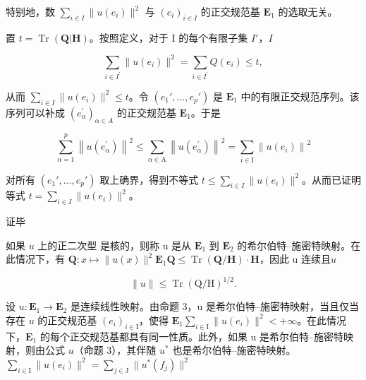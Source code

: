 特别地，数 \(\sum_{i\in I}\| u(e_i)\|^2\) 与 \((e_i)_{i\in I}\) 的正交规范基 \(\mathbf{E}_1\) 的选取无关。

置 \(t = \operatorname{Tr}(\mathbf{Q}|\mathbf{H})\)。按照定义，对于 I 的每个有限子集 \(I'\)，\(I\)

\[
\sum_ {i \in I ^ {\prime}} \| u (e _ {i}) \| ^ {2} = \sum_ {i \in I ^ {\prime}} Q (e _ {i}) \leqslant t,
\]

从而 \(\sum_{i\in I}\| u(e_i)\|^2\leqslant t\)。令 \((e_1',\dots ,e_p')\) 是 \(\mathbf{E}_1\) 中的有限正交规范序列。该序列可以补成 \((e_{\alpha}^{\prime})_{\alpha \in A}\) 的正交规范基 \(\mathbf{E}_1\)。于是

\[
\sum_ {\alpha = 1} ^ {p} \left\| u (e _ {\alpha} ^ {\prime}) \right\| ^ {2} \leqslant \sum_ {\alpha \in \mathrm{A}} \left\| u (e _ {\alpha} ^ {\prime}) \right\| ^ {2} = \sum_ {i \in \mathrm{I}} \left\| u (e _ {i}) \right\| ^ {2}
\]

对所有 \((e_1', \ldots, e_p')\) 取上确界，得到不等式 \(t \leqslant \sum_{i \in I} \| u(e_i) \|^2\)。从而已证明等式 \(t = \sum_{i \in I} \| u(e_i) \|^2\)。

证毕

如果 \(u\) 上的正二次型  是核的，则称 u 是从 \(\mathbf{E}_1\) 到 \(\mathbf{E}_2\) 的希尔伯特--施密特映射。在此情况下，有 \(\mathbf{Q}: x \mapsto \| u(x) \|^2\)\(\mathbf{E}_1\)\(\mathbf{Q} \leqslant \operatorname{Tr}(\mathbf{Q}/\mathbf{H}) \cdot \mathbf{H}\)，因此 u 连续且\(u\)

\[
\| u \| \leqslant \operatorname{Tr} (\mathrm{Q/H}) ^ {1 / 2}.
\]

设 \(u: \mathbf{E}_1 \to \mathbf{E}_2\) 是连续线性映射。由命题 3，u 是希尔伯特--施密特映射，当且仅当存在 \(u\) 的正交规范基 \((e_i)_{i \in \mathrm{I}}\)，使得 \(\mathbf{E}_1\)\(\sum_{i \in \mathrm{I}} \|u(e_i)\|^2 < +\infty\)。在此情况下，\(\mathbf{E}_1\) 的每个正交规范基都具有同一性质。此外，如果 u 是希尔伯特--施密特映射，则由公式 \(u\)（命题 3），其伴随 \(u^*\) 也是希尔伯特--施密特映射。\(\sum_{i \in \mathrm{I}} \|u(e_i)\|^2 = \sum_{j \in \mathrm{J}} \|u^*(f_j)\|^2\)

